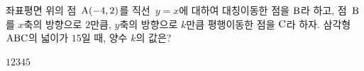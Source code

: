 좌표평면 위의 점~$\mathrm{A}(-4{,}\mkern3mu 2)$를 직선~$y=x$에 대하여 대칭이동한 점을 $\mathrm{B}$라 하고, 점~$\mathrm{B}$를 $x$축의 방향으로 $2$만큼, $y$축의 방향으로 $k$만큼 평행이동한 점을 $\mathrm{C}$라 하자. 삼각형~$\mathrm{ABC}$의 넓이가 $15$일 때, 양수 $k$의 값은?
\begin{choices32}{$1$}{$2$}{$3$}{$4$}{$5$}\end{choices32}

